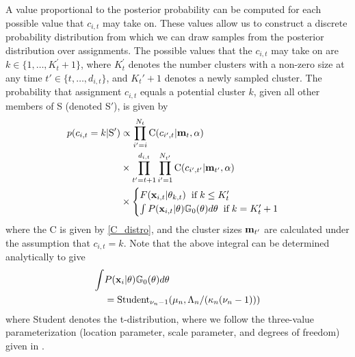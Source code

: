 \documentclass[twocolumn, final]{svjour3}
\begin{document}
A value proportional to the posterior probability can be computed for each possible value that $c_{i,t}$ may take on. These values allow us to construct a discrete probability distribution from which we can draw samples from the posterior distribution over assignments. The possible values that the $c_{i,t}$ may take on are $k \in \{ 1 , \ldots ,  K_{t}^{'}+1 \}$, where $K_{t}^{'}$ denotes the number clusters with a non-zero size at any time $t' \in \{ t, \ldots, d_{i,t} \}$, and $K_{t}'+1$ denotes a newly sampled cluster. The probability that assignment $c_{i,t}$ equals a potential cluster $k$, given all other members of S (denoted S$'$), is given by
\begin{equation}
\label{mcmc_assig_vars}
\begin{split}
p(c_{i,t} = k | \text{S}') & \propto
\prod_{i'=i}^{N_{t}}  \text{C}(c_{i',t} | \bold{m}_{t}, \alpha) \\
& \times \prod_{t' = t+1}^{d_{i,t}}  \prod_{i'=1}^{N_{t'}}   \text{C}(c_{i',t'} | \bold{m}_{t'}, \alpha) \\
 & \times
\begin{cases}
  F(\bold{x}_{i,t} | \theta_{k,t}) \hspace{2mm} \text{if} \hspace{1mm} k \leq K_{t}' \\ %
  \int P(\bold{x}_{i,t} | \theta) \mathbb{G}_{0}(\theta) d\theta \hspace{2mm} \text{if} \hspace{1mm}  k = K_{t}'+1
\end{cases}
\end{split}
\end{equation}
where the C is given by \eqref{C_distro}, and the cluster sizes $\bold{m}_{t'}$ are calculated under the assumption that $c_{i,t} = k$. Note that the above integral can be determined analytically to give
\begin{equation}
\begin{split}
\label{marginal_obs_prob}
\int & P(\bold{x}_{i} | \theta) \mathbb{G}_{0}(\theta)d\theta \\
&= \text{Student}_{\nu_{n} - 1}(\mu_{n}, \Lambda_{n}/(\kappa_{n}(\nu_{n}-1)))
\end{split}
\end{equation}
where Student denotes the t-distribution, where we follow the three-value parameterization (location parameter, scale parameter, and degrees of freedom) given in \cite{gelman2004bayesian}.
\end{document}
